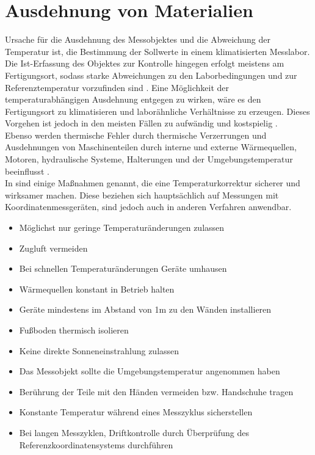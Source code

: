 \section{Ausdehnung von Materialien}\label{chap:Ausdehnung}

Ursache für die Ausdehnung des Messobjektes und die Abweichung der Temperatur ist, die Bestimmung der Sollwerte in einem klimatisierten Messlabor.\\
Die Ist-Erfassung des Objektes zur Kontrolle hingegen erfolgt meistens am Fertigungsort, sodass starke Abweichungen zu den Laborbedingungen und zur Referenztemperatur vorzufinden sind \cite{Ferger}.
Eine Möglichkeit der temperaturabhängigen Ausdehnung entgegen zu wirken, wäre es den Fertigungsort zu klimatisieren und laborähnliche Verhältnisse zu erzeugen. Dieses Vorgehen ist jedoch in den meisten Fällen zu aufwändig und kostspielig \cite{Bryan1965}.\\
Ebenso werden thermische Fehler durch thermische Verzerrungen und Ausdehnungen von Maschinenteilen durch interne und externe Wärmequellen, Motoren, hydraulische Systeme, Halterungen und der Umgebungstemperatur beeinflusst \cite{yuan1998}.\\
In \cite{Ferger} sind einige Maßnahmen genannt, die eine Temperaturkorrektur sicherer und wirksamer machen. Diese beziehen sich hauptsächlich auf Messungen mit Koordinatenmessgeräten, sind jedoch auch in anderen Verfahren anwendbar.
\begin{small}
	\begin{itemize}
		\item Möglichst nur geringe Temperaturänderungen zulassen
		\item Zugluft vermeiden
		\item Bei schnellen Temperaturänderungen Geräte umhausen
		\item Wärmequellen konstant in Betrieb halten
		\item Geräte mindestens im Abstand von 1m zu den Wänden installieren
		\item Fußboden thermisch isolieren
		\item Keine direkte Sonneneinstrahlung zulassen
		\item Das Messobjekt sollte die Umgebungstemperatur angenommen haben
		\item Berührung der Teile mit den Händen vermeiden bzw. Handschuhe tragen
		\item Konstante Temperatur während eines Messzyklus sicherstellen
		\item Bei langen Messzyklen, Driftkontrolle durch Überprüfung des Referenzkoordinatensystems durchführen
	\end{itemize}
\end{small}

